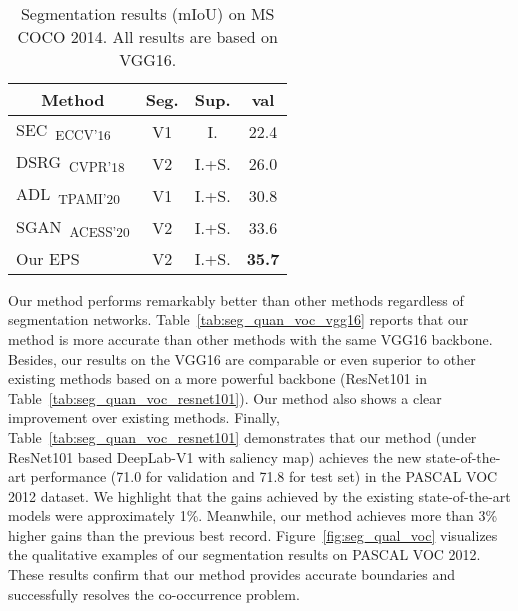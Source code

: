 \documentclass[final]{cvpr}
\begin{document}
\begin{table}[]
\centering
{\small
\begin{tabular}{@{}lccc@{}}
\toprule
\multicolumn{1}{c}{Method}                                                  &Seg.       &Sup.   & \multicolumn{1}{c}{val}           \\ \midrule
\multicolumn{1}{l}{SEC~\cite{kolesnikov2016seed}\textsubscript{ECCV'16}}    & V1        &I.     & \multicolumn{1}{c}{22.4}          \\
\multicolumn{1}{l}{DSRG~\cite{huang2018weakly}\textsubscript{CVPR'18}}      & V2        &I.+S.  & \multicolumn{1}{c}{26.0}          \\
\multicolumn{1}{l}{ADL~\cite{choe2020attention}\textsubscript{TPAMI'20}}    & V1        &I.+S.  & \multicolumn{1}{c}{30.8}          \\
\multicolumn{1}{l}{SGAN~\cite{yao2020saliency}\textsubscript{ACESS'20}}     & V2        &I.+S.  & \multicolumn{1}{c}{33.6}          \\ \midrule
\multicolumn{1}{l}{Our EPS}                                                 & V2        &I.+S.  & \multicolumn{1}{c}{\textbf{35.7}} \\ \bottomrule
\end{tabular}
}
\vspace{2mm}
\caption{Segmentation results (mIoU) on MS COCO 2014. All results are based on VGG16.}\vspace{-2mm}
\label{tab:seg_quantitative_coco}
\end{table} 
Our method performs remarkably better than other methods regardless of segmentation networks. Table~\ref{tab:seg_quan_voc_vgg16} reports that our method is more accurate than other methods with the same VGG16 backbone. Besides, our results on the VGG16 are comparable or even superior to other existing methods based on a more powerful backbone (\ie ResNet101 in Table~\ref{tab:seg_quan_voc_resnet101}). Our method also shows a clear improvement over existing methods. Finally, Table~\ref{tab:seg_quan_voc_resnet101} demonstrates that our method (under ResNet101 based DeepLab-V1 with saliency map) achieves the new state-of-the-art performance (71.0 for validation and 71.8 for test set) in the PASCAL VOC 2012 dataset. We highlight that the gains achieved by the existing state-of-the-art models were approximately 1\%. Meanwhile, our method achieves more than 3\% higher gains than the previous best record. Figure~\ref{fig:seg_qual_voc} visualizes the qualitative examples of our segmentation results on PASCAL VOC 2012. These results confirm that our method provides accurate boundaries and successfully resolves the co-occurrence problem. 
\end{document}
